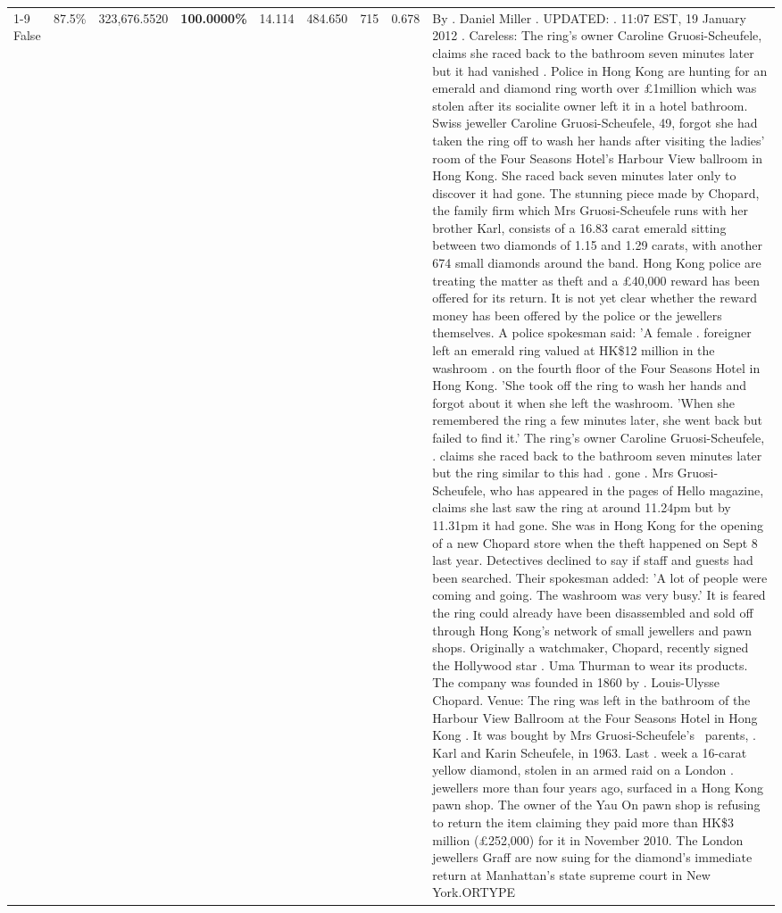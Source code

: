 \begin{table}[H]
\begin{tabular}{lllrlllll}
\cline{1-9}
False & 87.5\% & 323,676.5520 & \bfseries \color{red} 100.0000\% & 14.114 & 484.650 & 715 & 0.678 & By . Daniel Miller . UPDATED: . 11:07 EST, 19 January 2012 . Careless: The ring's owner Caroline Gruosi-Scheufele, claims she raced back to the bathroom seven minutes later but it had vanished . Police in Hong Kong are hunting for an emerald and diamond ring worth over £1million which was stolen after its socialite owner left it in a hotel bathroom. Swiss jeweller Caroline Gruosi-Scheufele, 49, forgot she had taken the ring off to wash her hands after visiting the ladies' room of the Four Seasons Hotel's Harbour View ballroom in Hong Kong. She raced back seven minutes later only to discover it had gone. The stunning piece made by Chopard, the family firm which Mrs Gruosi-Scheufele runs with her brother Karl, consists of a 16.83 carat emerald sitting between two diamonds of 1.15 and 1.29 carats, with another 674 small diamonds around the band. Hong Kong police are treating the matter as theft and a £40,000 reward has been offered for its return. It is not yet clear whether the reward money has been offered by the police or the jewellers themselves. A police spokesman said: 'A female . foreigner left an emerald ring valued at HK\$12 million in the washroom . on the fourth floor of the Four Seasons Hotel in Hong Kong. 'She took off the ring to wash her hands and forgot about it when she left the washroom. 'When she remembered the ring a few minutes later, she went back but failed to find it.' The ring's owner Caroline Gruosi-Scheufele, . claims she raced back to the bathroom seven minutes later but the ring similar to this had . gone . Mrs Gruosi-Scheufele, who has appeared in the pages of Hello magazine, claims she last saw the ring at around 11.24pm but by 11.31pm it had gone. She was in Hong Kong for the opening of a new Chopard store when the theft happened on Sept 8 last year. Detectives declined to say if staff and guests had been searched. Their spokesman added: 'A lot of people were coming and going. The washroom was very busy.' It is feared the ring could already have been disassembled and sold off through Hong Kong's network of small jewellers and pawn shops. Originally a watchmaker, Chopard, recently signed the Hollywood star . Uma Thurman to wear its products. The company was founded in 1860 by . Louis-Ulysse Chopard. Venue: The ring was left in the bathroom of the Harbour View Ballroom at the Four Seasons Hotel in Hong Kong . It was bought by Mrs Gruosi-Scheufele's  parents, . Karl and Karin Scheufele, in 1963. Last . week a 16-carat yellow diamond, stolen in an armed raid on a London . jewellers more than four years ago, surfaced in a Hong Kong pawn shop. The owner of the Yau On pawn shop is refusing to return the item claiming they paid more than HK\$3 million (£252,000) for it in November 2010. The London jewellers Graff are now suing for the diamond’s immediate return at Manhattan’s state supreme court in New York.ORTYPE \\

\end{tabular}
\end{table}
